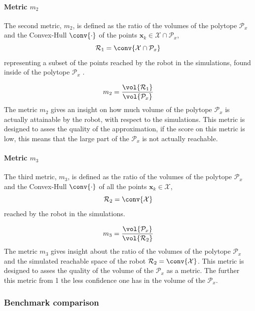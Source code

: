 \paragraph*{Metric $m_2$}  The second metric, $m_2$, is defined as the ratio of the volumes of the polytope $\mathcal{P}_x$ and the Convex-Hull $\conv{\cdot}$ of the points $\bm{x}_k\in\mathcal{X}\cap\mathcal{P}_x$, $$ \mathcal{R}_1 = \conv{\mathcal{X}\cap\mathcal{P}_x}$$ representing a subset of the points reached by the robot in the simulations, found inside of the polytope $\mathcal{P}_x$ .

\begin{equation}
    m_2 = \frac{\vol{ \mathcal{R}_1}}{\vol{\mathcal{P}_x}}
\end{equation}
The metric $m_2$ gives an insight on how much volume of the polytope $\mathcal{P}_x$ is actually attainable by the robot, with respect to the simulations. This metric is designed to asses the quality of the approximation, if the score on this metric is low, this means that the large part of the $\mathcal{P}_x$ is not actually reachable.

\paragraph*{Metric $m_3$}  The third metric, $m_3$, is defined as the ratio of the volumes of the polytope $\mathcal{P}_x$ and the Convex-Hull $\conv{\cdot}$ of all the points $\bm{x}_k\in\mathcal{X}$, $$ \mathcal{R}_2 = \conv{\mathcal{X}}$$ reached by the robot in the simulations.

\begin{equation}
    m_3 = \frac{\vol{\mathcal{P}_x}}{\vol{ \mathcal{R}_2 }}
\end{equation}
The metric $m_3$ gives insight about the ratio of the volumes of the polytope $\mathcal{P}_x$ and the simulated reachable space of the robot $\mathcal{R}_2 = \conv{\mathcal{X}}$. This metric is designed to asses the quality of the volume of the $\mathcal{P}_x$ as a metric. The further this metric from 1 the less confidence one has in the volume of the $\mathcal{P}_x$.

\subsubsection{Benchmark comparison}

